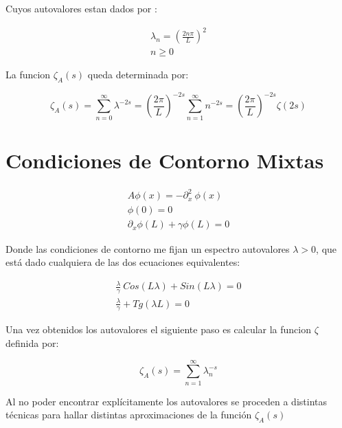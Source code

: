 Cuyos autovalores estan dados por  : 

\begin{equation}
\begin{array}{c}
	\lambda _n = \left( \frac{2 n \pi }{L} \right) ^2 \\
	n \geq 0
\end{array}
\end{equation}

La funcion $\zeta _A (s)$ queda determinada por:

\begin{equation}
\zeta _A (s) = 
\sum _{n=0} ^{\infty} \lambda ^{-2s} =  
\left( \frac{2 \pi}{L} \right) ^{-2s} \sum _{n=1} ^{\infty} n ^{-2s} = 
\left( \frac{2 \pi}{L} \right) ^{-2s} \zeta (2s)
\end{equation}

\section{Condiciones de Contorno Mixtas}

\begin{equation}
\begin{array}{c}
    A \phi (x) = - \partial ^2 _x \ \phi (x)  \\
    \phi (0) = 0 \\ 
    \partial _x \phi (L) + \gamma \phi (L) = 0
\end{array}
\end{equation}

Donde las condiciones de contorno me fijan un espectro autovalores $\lambda > 0 $, que está dado cualquiera de las dos ecuaciones equivalentes: 

\begin{equation}
\begin{array}{cc}
    \frac{\lambda}{\gamma}  \ Cos( L \lambda ) +   Sin( L \lambda ) = 0 \\
    \frac{\lambda}{\gamma}  + Tg(\lambda L )  = 0 
\label{autovalores}
\end{array}
\end{equation}

Una vez obtenidos los autovalores el siguiente paso es calcular la funcion $\zeta$ definida por:

\begin{equation}
    \zeta _ {A } (s) = \sum_{n = 1} ^{ \infty } \lambda _n ^ {-s}
\end{equation}

Al no poder encontrar explícitamente los autovalores se proceden a distintas técnicas para hallar distintas aproximaciones de la función $\zeta _A (s)$

